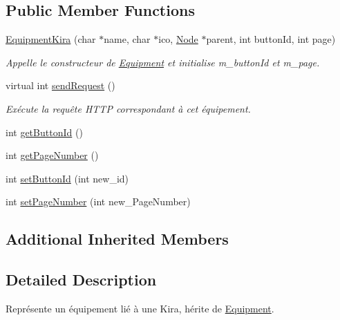\subsection*{Public Member Functions}
\begin{DoxyCompactItemize}
\item 
\hyperlink{class_e_p_1_1_equipment_kira_a7b96ccdab1a7d69e656c9602fce99213}{Equipment\+Kira} (char $\ast$name, char $\ast$ico, \hyperlink{class_e_p_1_1_node}{Node} $\ast$parent, int button\+Id, int page)
\begin{DoxyCompactList}\small\item\em Appelle le constructeur de \hyperlink{class_e_p_1_1_equipment}{Equipment} et initialise m\+\_\+button\+Id et m\+\_\+page. \end{DoxyCompactList}\item 
virtual int \hyperlink{class_e_p_1_1_equipment_kira_ad59c93de1b98996ec273c5638cd7e47a}{send\+Request} ()\hypertarget{class_e_p_1_1_equipment_kira_ad59c93de1b98996ec273c5638cd7e47a}{}\label{class_e_p_1_1_equipment_kira_ad59c93de1b98996ec273c5638cd7e47a}

\begin{DoxyCompactList}\small\item\em Exécute la requête H\+T\+TP correspondant à cet équipement. \end{DoxyCompactList}\item 
int \hyperlink{class_e_p_1_1_equipment_kira_ae2ce7a10bf38a28b5c0c8f44420c3f10}{get\+Button\+Id} ()
\item 
int \hyperlink{class_e_p_1_1_equipment_kira_a689d07be3886b6b195e9c7bb3c20986d}{get\+Page\+Number} ()
\item 
int \hyperlink{class_e_p_1_1_equipment_kira_a1e695e63e1e736d1d107079a8277db2c}{set\+Button\+Id} (int new\+\_\+id)
\item 
int \hyperlink{class_e_p_1_1_equipment_kira_a788cf486ccf2652a40f4104f27478d74}{set\+Page\+Number} (int new\+\_\+\+Page\+Number)
\end{DoxyCompactItemize}
\subsection*{Additional Inherited Members}


\subsection{Detailed Description}
Représente un équipement lié à une Kira, hérite de \hyperlink{class_e_p_1_1_equipment}{Equipment}. 

